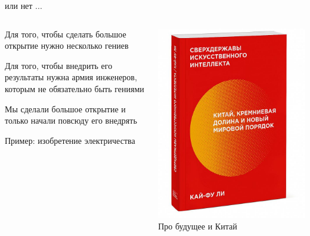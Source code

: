 \documentclass[notes,12pt, aspectratio=169]{beamer}
\newenvironment{wideitemize}{\itemize\addtolength{\itemsep}{10pt}}{\enditemize}
\begin{document}
\begin{frame}{или нет ... }
\begin{columns}
\begin{column}{0.6\textwidth}
	\begin{wideitemize}
		\item  Для того, чтобы сделать большое открытие нужно несколько гениев
		\item  Для того, чтобы внедрить его результаты нужна армия инженеров, которым не обязательно быть гениями
		\item  Мы сделали большое открытие и только начали повсюду его внедрять
		\item \alert{Пример:} изобретение электричества 
	\end{wideitemize}
\end{column}
\hfill%
\begin{column}{0.4\textwidth}
		\begin{center}
			\includegraphics[width=.7\linewidth]{book_ch.jpg} \\
			\footnotesize Про будущее и Китай
		\end{center}
\end{column}
\end{columns}
\end{frame} 
\end{document}
